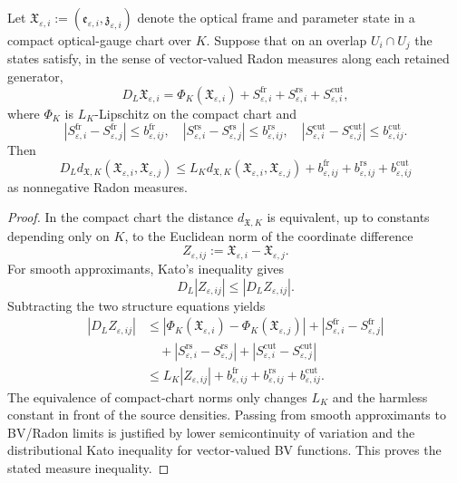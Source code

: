 \begin{lemma}\label{lem:CompactGaugeKatoTransition}
Let $\mathfrak X_{\varepsilon,i}:=(\mathfrak e_{\varepsilon,i},\mathfrak z_{\varepsilon,i})$ denote the optical frame and parameter state in a compact optical-gauge chart over $K$.  Suppose that on an overlap $U_i\cap U_j$ the states satisfy, in the sense of vector-valued Radon measures along each retained generator,
\[
    D_L\mathfrak X_{\varepsilon,i}
    =
    \Phi_K(\mathfrak X_{\varepsilon,i})
    +
    S^{\mathrm{fr}}_{\varepsilon,i}
    +
    S^{\mathrm{rs}}_{\varepsilon,i}
    +
    S^{\mathrm{cut}}_{\varepsilon,i},
\]
where $\Phi_K$ is $L_K$-Lipschitz on the compact chart and
\[
    |S^{\mathrm{fr}}_{\varepsilon,i}-S^{\mathrm{fr}}_{\varepsilon,j}|
    \le b^{\mathrm{fr}}_{\varepsilon,ij},
    \quad
    |S^{\mathrm{rs}}_{\varepsilon,i}-S^{\mathrm{rs}}_{\varepsilon,j}|
    \le b^{\mathrm{rs}}_{\varepsilon,ij},
    \quad
    |S^{\mathrm{cut}}_{\varepsilon,i}-S^{\mathrm{cut}}_{\varepsilon,j}|
    \le b^{\mathrm{cut}}_{\varepsilon,ij}.
\]
Then
\[
    D_L d_{\mathfrak X,K}(\mathfrak X_{\varepsilon,i},\mathfrak X_{\varepsilon,j})
    \le
    L_K d_{\mathfrak X,K}(\mathfrak X_{\varepsilon,i},\mathfrak X_{\varepsilon,j})
    +
    b^{\mathrm{fr}}_{\varepsilon,ij}
    +
    b^{\mathrm{rs}}_{\varepsilon,ij}
    +
    b^{\mathrm{cut}}_{\varepsilon,ij}
\]
as nonnegative Radon measures.
\end{lemma}

\begin{proof}
In the compact chart the distance $d_{\mathfrak X,K}$ is equivalent, up to constants depending only on $K$, to the Euclidean norm of the coordinate difference
\[
    Z_{\varepsilon,ij}:=\mathfrak X_{\varepsilon,i}-\mathfrak X_{\varepsilon,j}.
\]
For smooth approximants, Kato's inequality gives
\[
    D_L|Z_{\varepsilon,ij}|
    \le
    |D_LZ_{\varepsilon,ij}|.
\]
Subtracting the two structure equations yields
\[
\begin{split}
    |D_LZ_{\varepsilon,ij}|
    &\le
    |\Phi_K(\mathfrak X_{\varepsilon,i})-\Phi_K(\mathfrak X_{\varepsilon,j})|
    +
    |S^{\mathrm{fr}}_{\varepsilon,i}-S^{\mathrm{fr}}_{\varepsilon,j}| \\
    &\quad+
    |S^{\mathrm{rs}}_{\varepsilon,i}-S^{\mathrm{rs}}_{\varepsilon,j}|
    +
    |S^{\mathrm{cut}}_{\varepsilon,i}-S^{\mathrm{cut}}_{\varepsilon,j}| \\
    &\le
    L_K|Z_{\varepsilon,ij}|
    +
    b^{\mathrm{fr}}_{\varepsilon,ij}
    +
    b^{\mathrm{rs}}_{\varepsilon,ij}
    +
    b^{\mathrm{cut}}_{\varepsilon,ij}.
\end{split}
\]
The equivalence of compact-chart norms only changes $L_K$ and the harmless constant in front of the source densities.  Passing from smooth approximants to BV/Radon limits is justified by lower semicontinuity of variation and the distributional Kato inequality for vector-valued BV functions.  This proves the stated measure inequality.
\end{proof}

